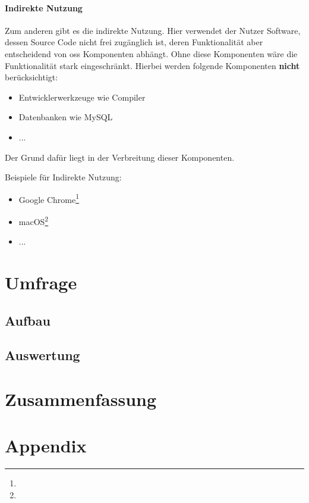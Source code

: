 \documentclass[a4paper]{article}
\begin{document}
            \paragraph{Indirekte Nutzung}
                Zum anderen gibt es die indirekte Nutzung. Hier verwendet der Nutzer Software, dessen Source Code nicht frei zugänglich ist, deren Funktionalität aber entscheidend von \gls{oss} Komponenten abhängt. Ohne diese Komponenten wäre die Funktionalität stark eingeschränkt. Hierbei werden folgende Komponenten \textbf{nicht} berücksichtigt:
                
                \begin{itemize}
                    \item Entwicklerwerkzeuge wie Compiler
                    \item Datenbanken wie MySQL
                    \item ... %
                \end{itemize}
                Der Grund dafür liegt in der Verbreitung dieser Komponenten. %
                
                Beispiele für Indirekte Nutzung:
                \begin{itemize}
                    \item Google Chrome\footnote{}
                    \item macOS\footnote{}
                    \item ... %
                \end{itemize}
        
    \section{Umfrage}
        \subsection{Aufbau}
            
        \subsection{Auswertung}
    
    \section{Zusammenfassung}
    
    \clearpage
    \section*{Appendix}
    
        \printglossary[type=\acronymtype]
        \printglossary
        
        \clearpage
        \nocite{*}
        \printbibliography
        
        
\end{document}
